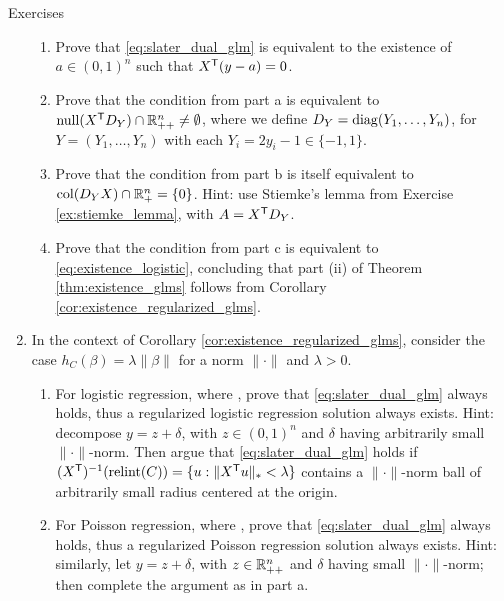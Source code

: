 \begin{xcb}{Exercises}
\begin{enumerate}[label=\thechapter.\arabic*]
\begin{enumerate}[label=\alph*.]
\item Prove that \eqref{eq:slater_dual_glm} is equivalent to the existence of $a
  \in (0,1)^n$ such that $X^{\mathsf{T}} (y - a) = 0$.

\item Prove that the condition from part a is equivalent to $\operatorname{null}(X^{\mathsf{T}} 
  D_Y) \cap \mathbb{R}_{++}^n \not= \emptyset$, where we define $D_Y =
  \operatorname{diag}(Y_1,\dots,Y_n)$, for $Y = (Y_1,\dots,Y_n)$ with each $Y_i = 2y_i - 1 \in
  \{-1,1\}$.

\item Prove that the condition from part b is itself equivalent to $\operatorname{col}(D_Y X)
  \cap \mathbb{R}_+^n = \{0\}$. Hint: use Stiemke's lemma from Exercise 
  \ref{ex:stiemke_lemma}, with $A = X^{\mathsf{T}} D_Y$. 

\item Prove that the condition from part c is equivalent to
  \eqref{eq:existence_logistic}, concluding that part (ii) of Theorem
  \ref{thm:existence_glms} follows from Corollary
  \ref{cor:existence_regularized_glms}.  
\end{enumerate}

\item \label{ex:existence_regularized_glms}
  In the context of Corollary \ref{cor:existence_regularized_glms}, consider the
  case $h_C(\beta) = \lambda \|\beta\|$ for a norm $\|\cdot\|$ and $\lambda >
  0$.  

\begin{enumerate}[label=\alph*.]
\item For logistic regression, where , prove that \eqref{eq:slater_dual_glm} always holds,
  thus a regularized logistic regression solution always exists. Hint: decompose
  $y = z + \delta$, with $z \in (0,1)^n$ and $\delta$ having arbitrarily small 
  $\|\cdot\|$-norm. Then argue that \eqref{eq:slater_dual_glm} holds if
  $(X^{\mathsf{T}})^{-1} (\operatorname{relint}(C)) = \{ u : \|X^{\mathsf{T}} u\|_* < \lambda\}$ contains a
  $\|\cdot\|$-norm ball of arbitrarily small radius centered at the origin.  

\item For Poisson regression, where ,
  prove that \eqref{eq:slater_dual_glm} always holds, thus a regularized Poisson
  regression solution always exists. Hint: similarly, let $y = z + \delta$, with
  $z \in \mathbb{R}_{++}^n$ and $\delta$ having small $\|\cdot\|$-norm; then complete
  the argument as in part a.  
\end{enumerate}


\end{enumerate}
\end{xcb}
